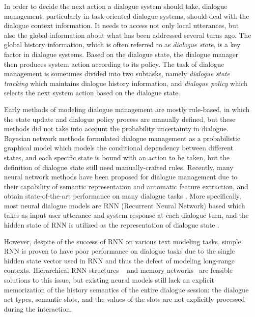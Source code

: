 In order to decide the next action a dialogue system should take, dialogue management, particularly in task-oriented dialogue systems, should deal with the dialogue context information. It needs to access not only local utterances, but also the global information about what has been addressed several turns ago. The global history information, which is often referred to as \emph{dialogue state}, is a key factor in dialogue systems. Based on the dialogue state, the dialogue manager then produces system action according to its policy. The task of dialogue management is sometimes divided into two subtasks, namely {\it dialogue state tracking} which maintains dialogue history information, and {\it dialogue policy} which selects the next system action based on the dialogue state. 

Early methods of modeling dialogue management are mostly rule-based, in which the state update and dialogue policy process are manually defined, but these methods did not take into account the probability uncertainty in dialogue. Bayesian network methods \cite{paek2005markov, williams2007partially} formulated dialogue management as a probabilistic graphical model which models the conditional dependency between different states, and each specific state is bound with an action to be taken, but the definition of dialogue state still need manually-crafted rules. Recently, many neural network methods have been proposed for dialogue management due to their capability of semantic representation and automatic feature extraction, and obtain state-of-the-art performance on many dialogue tasks \cite{ge2015dialogue, serban2016building}. More specifically, most neural dialogue models are RNN (Recurrent Neural Network) based which takes as input user utterance and system response at each dialogue turn, and the hidden state of RNN is utilized as the representation of dialogue state \cite{henderson2014word, williams2017hybrid}.

However, despite of the success of RNN on various text modeling tasks, simple RNN is proven to have poor performance on dialogue tasks \cite{williams2017hybrid} due to the single hidden state vector used in RNN and thus the defect of modeling long-range contexts. Hierarchical RNN structures ~\cite{serban2016hierarchical} and memory networks~\cite{weston2014memory,dodge2015evaluating, bordes2016learning} are feasible solutions to this issue, but existing neural models still lack an explicit memorization of the history semantics of the entire dialogue session: the dialogue act types, semantic slots, and the values of the slots are not explicitly processed during the interaction.

